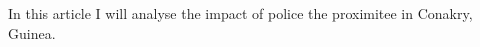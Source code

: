 \documentclass[draft.tex]{subfiles}
\begin{document}
In this article I will analyse the impact of police the proximitee in Conakry, Guinea.
\end{document}
